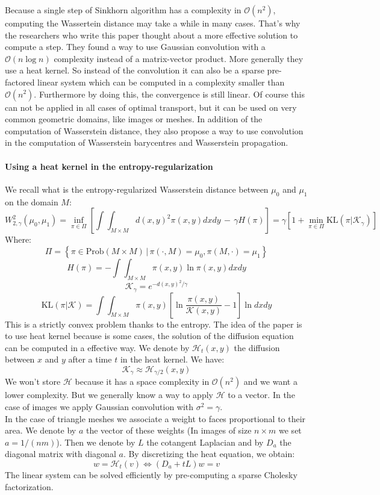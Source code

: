 Because a single step of Sinkhorn algorithm has a complexity in $\mathcal{O}(n^2)$, computing the Wassertein distance may take a while in many cases. That's why the researchers who write this paper thought about a more effective solution to compute a step. They found a way to use Gaussian convolution with a $\mathcal{O}(n \log n)$ complexity instead of a matrix-vector product. More generally they use a heat kernel. So instead of the convolution it can also be a sparse pre-factored linear system which can be computed in a complexity smaller than $\mathcal{O}(n^2)$. Furthermore by doing this, the convergence is still linear. Of course this can not be applied in all cases of optimal transport, but it can be used on very common geometric domains, like images or meshes. In addition of the computation of Wasserstein distance, they also propose a way to use convolution in the computation of Wasserstein barycentres and Wasserstein propagation.

\paragraph{Using a heat kernel in the entropy-regularization}
We recall what is the entropy-regularized Wasserstein distance between $\mu_0$ and $\mu_1$ on the domain $M$:
$$ W_{2, \gamma}^2(\mu_0, \mu_1) = \inf_{\pi \in \Pi} \left[ \int \int_{M \times M} d(x, y)^2 \pi(x, y) dx dy \, - \, \gamma H(\pi) \right] = \gamma \left[ 1 + \min_{\pi \in \Pi} \text{KL}(\pi | \mathcal{K}_\gamma) \right]$$
Where:
$$ \Pi = \left\{ \pi \in \text{Prob}(M \times M) \, | \, \pi(\cdot, M) = \mu_0, \pi(M, \cdot) = \mu_1 \right\} $$
$$ H(\pi) = - \int \int_{M \times M} \pi(x, y) \ln \pi(x, y) dx dy $$
$$ \mathcal{K}_\gamma = e^{-d(x, y)^2 / \gamma} $$
$$ \text{KL}(\pi | \mathcal{K}) = \int \int_{M \times M} \pi(x, y) \left[ \ln \dfrac{\pi(x, y)}{\mathcal{K}(x, y)} - 1 \right]\ln  dx dy $$
This is a strictly convex problem thanks to the entropy. The idea of the paper is to use heat kernel because is some cases, the solution of the diffusion equation can be computed in a effective way. We denote by $\mathcal{H}_t(x, y)$ the diffusion between $x$ and $y$ after a time $t$ in the heat kernel. We have:
$$ \mathcal{K}_\gamma \approx \mathcal{H}_{\gamma / 2}(x, y) $$
We won't store $\mathcal{H}$ because it has a space complexity in $\mathcal{O}(n^2)$ and we want a lower complexity. But we generally know a way to apply $\mathcal{H}$ to a vector. In the case of images we apply Gaussian convolution with $\sigma^2 = \gamma$. \\
In the case of triangle meshes we associate a weight to faces proportional to their area. We denote by $a$ the vector of these weights (In images of size $n \times m$ we set $a = 1 / (nm)$). Then we denote by $L$ the cotangent Laplacian and by $D_a$ the diagonal matrix with diagonal $a$. By discretizing the heat equation, we obtain:
$$ w = \mathcal{H}_t(v) \Leftrightarrow \left( D_a + t L \right) w = v $$
The linear system can be solved efficiently by pre-computing a sparse Cholesky factorization.

